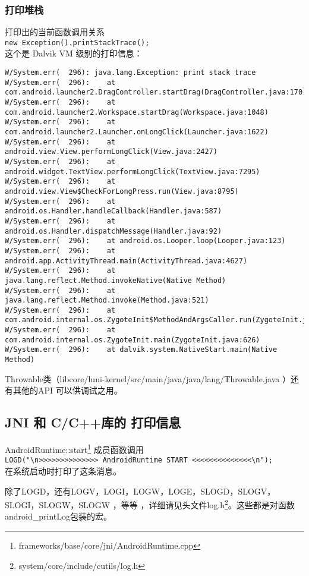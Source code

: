 \documentclass[a4paper,titlepage]{article}
\begin{document}
\subsubsection{打印堆栈}
打印出的当前函数调用关系\\
\lstinline{new Exception().printStackTrace();}\\
这个是 Dalvik VM 级别的打印信息：
\begin{verbatim}
W/System.err(  296): java.lang.Exception: print stack trace 
W/System.err(  296): 	at com.android.launcher2.DragController.startDrag(DragController.java:170) 
W/System.err(  296): 	at com.android.launcher2.Workspace.startDrag(Workspace.java:1048) 
W/System.err(  296): 	at com.android.launcher2.Launcher.onLongClick(Launcher.java:1622) 
W/System.err(  296): 	at android.view.View.performLongClick(View.java:2427) 
W/System.err(  296): 	at android.widget.TextView.performLongClick(TextView.java:7295) 
W/System.err(  296): 	at android.view.View$CheckForLongPress.run(View.java:8795) 
W/System.err(  296): 	at android.os.Handler.handleCallback(Handler.java:587) 
W/System.err(  296): 	at android.os.Handler.dispatchMessage(Handler.java:92) 
W/System.err(  296): 	at android.os.Looper.loop(Looper.java:123) 
W/System.err(  296): 	at android.app.ActivityThread.main(ActivityThread.java:4627) 
W/System.err(  296): 	at java.lang.reflect.Method.invokeNative(Native Method) 
W/System.err(  296): 	at java.lang.reflect.Method.invoke(Method.java:521) 
W/System.err(  296): 	at com.android.internal.os.ZygoteInit$MethodAndArgsCaller.run(ZygoteInit.java:868) 
W/System.err(  296): 	at com.android.internal.os.ZygoteInit.main(ZygoteInit.java:626) 
W/System.err(  296): 	at dalvik.system.NativeStart.main(Native Method) 
\end{verbatim}

Throwable类（libcore/luni-kernel/src/main/java/java/lang/Throwable.java ）还有其他的API 可以供调试之用。


\subsection{JNI 和 C/C++库的 打印信息}
AndroidRuntime::start\footnote{frameworks/base/core/jni/AndroidRuntime.cpp}
成员函数调用 \\
\lstinline{LOGD("\n>>>>>>>>>>>>>> AndroidRuntime START <<<<<<<<<<<<<<\n"); }\\
在系统启动时打印了这条消息。 

除了LOGD，还有LOGV，LOGI，LOGW，LOGE，SLOGD，SLOGV，SLOGI，SLOGW，SLOGW ，等等
，详细请见头文件log.h\footnote{system/core/include/cutils/log.h}。这些都是对函数
android_printLog包装的宏。
\end{document}
